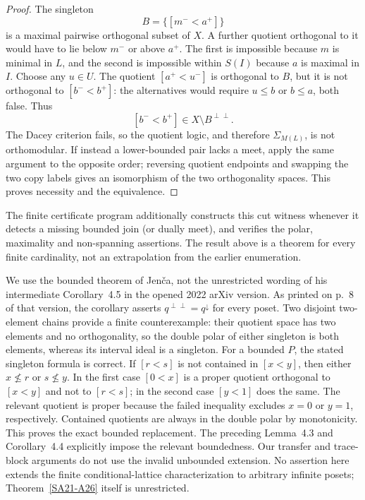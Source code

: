 \begin{proof}
The singleton
\[
 B=\{[m^-<a^+]\}
\]
is a maximal pairwise orthogonal subset of $X$. A further quotient
orthogonal to it would have to lie below $m^-$ or above $a^+$.
The first is impossible because $m$ is minimal in $L$, and the
second is impossible within $S(I)$ because $a$ is maximal in $I$.
Choose any $u\in U$. The quotient $[a^+<u^-]$ is orthogonal to
$B$, but it is not orthogonal to $[b^-<b^+]$: the alternatives would
require $u\le b$ or $b\le a$, both false. Thus
\[
 [b^-<b^+]\in X\setminus B^{\perp\perp}.
\]
The Dacey criterion fails, so the quotient logic, and therefore
$\Sigma_{M(L)}$, is not orthomodular. If instead a lower-bounded
pair lacks a meet, apply the same argument to the opposite order;
reversing quotient endpoints and swapping the two copy labels gives
an isomorphism of the two orthogonality spaces. This proves necessity and the equivalence.
\end{proof}

The finite certificate program additionally constructs this cut witness
whenever it detects a missing bounded join (or dually meet), and verifies
the polar, maximality and non-spanning assertions. The result above is
a theorem for every finite cardinality, not an extrapolation from the
earlier enumeration.

\begin{remark}
\label{SA21-A28}
We use the bounded theorem of Jen\v ca, not the unrestricted wording
of his intermediate Corollary~4.5 in the opened 2022 arXiv version.
As printed on p.~8 of that version, the corollary
asserts $q^{\perp\perp}=q^{\downarrow}$ for every poset. Two disjoint
two-element chains provide a finite counterexample: their quotient
space has two elements and no orthogonality, so the double polar of
either singleton is both elements, whereas its interval ideal is a
singleton. For a bounded $P$, the stated singleton formula is correct. If
$[r<s]$ is not contained in $[x<y]$, then either $x\not\le r$
or $s\not\le y$. In the first case $[0<x]$ is a proper quotient
orthogonal to $[x<y]$ and not to $[r<s]$; in the second case
$[y<1]$ does the same. The relevant quotient is proper because the
failed inequality excludes $x=0$ or $y=1$, respectively. Contained
quotients are always in the double polar by monotonicity. This proves
the exact bounded replacement. The preceding Lemma~4.3 and
Corollary~4.4 explicitly impose the relevant boundedness. Our transfer and trace-block arguments do
not use the invalid unbounded extension. No assertion here extends
the finite conditional-lattice characterization to arbitrary infinite
posets; Theorem~\ref{SA21-A26} itself is unrestricted.
\end{remark}
